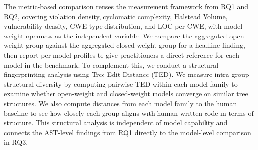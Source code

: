 The metric-based comparison reuses the measurement framework from RQ1 and RQ2, covering violation density, cyclomatic complexity, Halstead Volume, vulnerability density, CWE type distribution, and LOC-per-CWE, with model weight openness as the independent variable. We compare the aggregated open-weight group against the aggregated closed-weight group for a headline finding, then report per-model profiles to give practitioners a direct reference for each model in the benchmark. To complement this, we conduct a structural fingerprinting analysis using Tree Edit Distance (TED). We measure intra-group structural diversity by computing pairwise TED within each model family to examine whether open-weight and closed-weight models converge on similar tree structures. We also compute distances from each model family to the human baseline to see how closely each group aligns with human-written code in terms of structure. This structural analysis is independent of model capability and connects the AST-level findings from RQ1 directly to the model-level comparison in RQ3.
